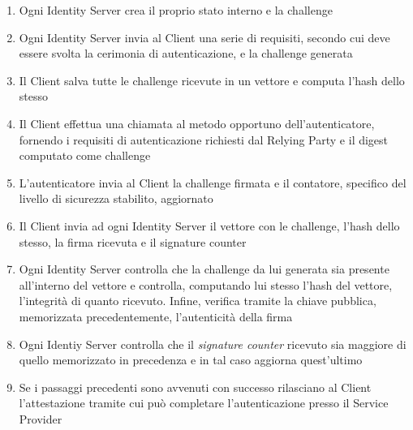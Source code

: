 \begin{enumerate}
	\item Ogni Identity Server crea il proprio stato interno e la challenge
	\item Ogni Identity Server invia al Client una serie di requisiti, secondo cui deve essere svolta la cerimonia di autenticazione, e la challenge generata
	\item Il Client salva tutte le challenge ricevute in un vettore e computa l'hash dello stesso
	\item Il Client effettua una chiamata al metodo opportuno dell'autenticatore, fornendo i requisiti di autenticazione richiesti dal Relying Party e il digest computato come challenge
	\item L'autenticatore invia al Client la challenge firmata e il contatore, specifico del livello di sicurezza stabilito, aggiornato
	\item Il Client invia ad ogni Identity Server il vettore con le challenge, l'hash dello stesso, la firma ricevuta e il signature counter
	\item Ogni Identity Server controlla che la challenge da lui generata sia presente all'interno del vettore e controlla, computando lui stesso l'hash del vettore, l'integrità di quanto ricevuto. Infine, verifica tramite la chiave pubblica, memorizzata precedentemente, l'autenticità della firma
	\item Ogni Identiy Server controlla che il \emph{signature counter} ricevuto sia maggiore di quello memorizzato in precedenza e in tal caso aggiorna quest'ultimo
	\item Se i passaggi precedenti sono avvenuti con successo rilasciano al Client l'attestazione tramite cui può completare l'autenticazione presso il Service Provider
\end{enumerate}